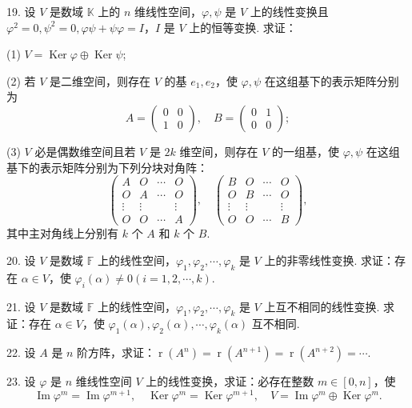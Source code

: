 \documentclass[UTF8,12pt,a4paper,fontset=fandol]{ctexart}
\begin{document}
19. 设 $V$ 是数域 $\mathbb{K}$ 上的 $n$ 维线性空间，$\varphi,\psi$ 是 $V$ 上的线性变换且 $\varphi^2=0,\psi^2=0,\varphi\psi+\psi\varphi=I$，$I$ 是 $V$ 上的恒等变换. 求证：

(1) $V=\operatorname{Ker}\varphi\oplus\operatorname{Ker}\psi$;

(2) 若 $V$ 是二维空间，则存在 $V$ 的基 $e_1,e_2$，使 $\varphi,\psi$ 在这组基下的表示矩阵分别为
\[
A=\left(\begin{array}{cc}
0&0\\
1&0
\end{array}\right),\quad
B=\left(\begin{array}{cc}
0&1\\
0&0
\end{array}\right);
\]

(3) $V$ 必是偶数维空间且若 $V$ 是 $2k$ 维空间，则存在 $V$ 的一组基，使 $\varphi,\psi$ 在这组基下的表示矩阵分别为下列分块对角阵：
\[
\left(\begin{array}{cccc}
A&O&\cdots&O\\
O&A&\cdots&O\\
\vdots&\vdots&&\vdots\\
O&O&\cdots&A
\end{array}\right),\quad
\left(\begin{array}{cccc}
B&O&\cdots&O\\
O&B&\cdots&O\\
\vdots&\vdots&&\vdots\\
O&O&\cdots&B
\end{array}\right),
\]
其中主对角线上分别有 $k$ 个 $A$ 和 $k$ 个 $B$.

20. 设 $V$ 是数域 $\mathbb{F}$ 上的线性空间，$\varphi_1,\varphi_2,\cdots,\varphi_k$ 是 $V$ 上的非零线性变换. 求证：存在 $\alpha\in V$，使 $\varphi_i(\alpha)\neq 0(i=1,2,\cdots,k)$.

21. 设 $V$ 是数域 $\mathbb{F}$ 上的线性空间，$\varphi_1,\varphi_2,\cdots,\varphi_k$ 是 $V$ 上互不相同的线性变换. 求证：存在 $\alpha\in V$，使 $\varphi_1(\alpha),\varphi_2(\alpha),\cdots,\varphi_k(\alpha)$ 互不相同.

22. 设 $A$ 是 $n$ 阶方阵，求证：$\operatorname{r}(A^n)=\operatorname{r}(A^{n+1})=\operatorname{r}(A^{n+2})=\cdots$.

23. 设 $\varphi$ 是 $n$ 维线性空间 $V$ 上的线性变换，求证：必存在整数 $m\in[0,n]$，使
\[
\operatorname{Im}\varphi^m=\operatorname{Im}\varphi^{m+1},\quad \operatorname{Ker}\varphi^m=\operatorname{Ker}\varphi^{m+1},\quad V=\operatorname{Im}\varphi^m\oplus\operatorname{Ker}\varphi^m.
\]
\end{document}
